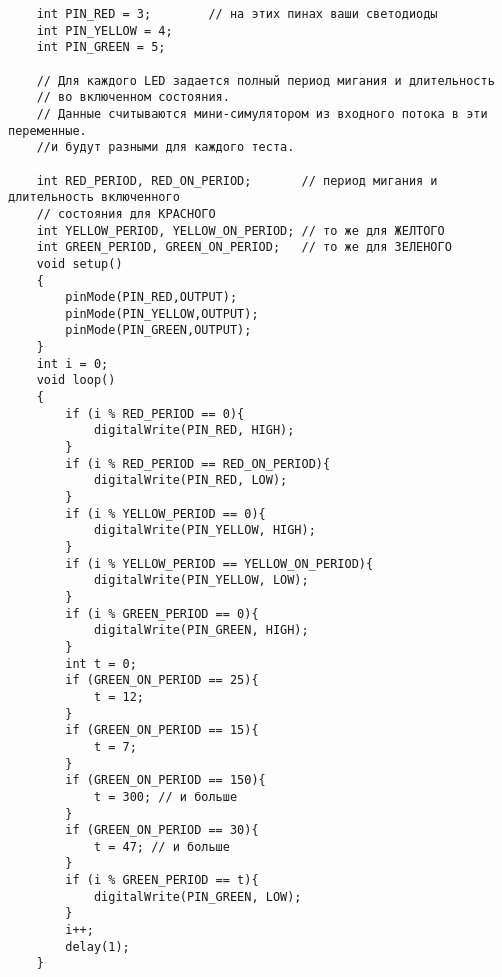 \codeExample

\begin{verbatim}
    int PIN_RED = 3;        // на этих пинах ваши светодиоды
    int PIN_YELLOW = 4;
    int PIN_GREEN = 5;

    // Для каждого LED задается полный период мигания и длительность 
    // во включенном состояния.
    // Данные считываются мини-симулятором из входного потока в эти переменные. 
    //и будут разными для каждого теста.

    int RED_PERIOD, RED_ON_PERIOD;       // период мигания и длительность включенного 
    // состояния для КРАСНОГО
    int YELLOW_PERIOD, YELLOW_ON_PERIOD; // то же для ЖЕЛТОГО
    int GREEN_PERIOD, GREEN_ON_PERIOD;   // то же для ЗЕЛЕНОГО 
    void setup()
    {
        pinMode(PIN_RED,OUTPUT);
        pinMode(PIN_YELLOW,OUTPUT);
        pinMode(PIN_GREEN,OUTPUT);
    }
    int i = 0;
    void loop()
    {
        if (i % RED_PERIOD == 0){
            digitalWrite(PIN_RED, HIGH);
        }
        if (i % RED_PERIOD == RED_ON_PERIOD){
            digitalWrite(PIN_RED, LOW);   
        }
        if (i % YELLOW_PERIOD == 0){
            digitalWrite(PIN_YELLOW, HIGH);
        }
        if (i % YELLOW_PERIOD == YELLOW_ON_PERIOD){
            digitalWrite(PIN_YELLOW, LOW);   
        }
        if (i % GREEN_PERIOD == 0){
            digitalWrite(PIN_GREEN, HIGH);
        }
        int t = 0;
        if (GREEN_ON_PERIOD == 25){
            t = 12;
        }
        if (GREEN_ON_PERIOD == 15){
            t = 7;
        }
        if (GREEN_ON_PERIOD == 150){
            t = 300; // и больше
        }
        if (GREEN_ON_PERIOD == 30){
            t = 47; // и больше
        }
        if (i % GREEN_PERIOD == t){
            digitalWrite(PIN_GREEN, LOW);   
        }
        i++;
        delay(1);
    }
\end{verbatim}